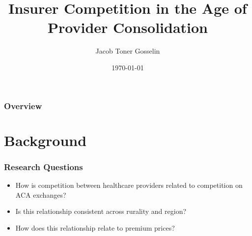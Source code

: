 \documentclass{beamer}
\title[BA Thesis]{Insurer Competition in the Age of Provider Consolidation} %
\author{Jacob Toner Gosselin} %
\institute[UChicago] %
{
University of Chicago \\ %
\medskip
\textit{jacobgosselin@uchicago.edu} %
}
\date{\today} %
\begin{document}
\begin{frame}
\titlepage %
\end{frame}

\begin{frame}
\frametitle{Overview} %
\tableofcontents %
\end{frame}


\section[Background]{Background} %


\begin{frame}
\frametitle{Research Questions}
\begin{itemize}
\item How is competition between healthcare providers related to competition on ACA exchanges?
\item Is this relationship consistent across rurality and region?
\item How does this relationship relate to premium prices?
\end{itemize}
\end{frame}

\end{document}
